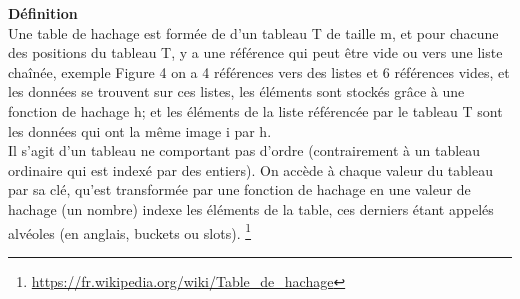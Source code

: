 \documentclass[hidelinks,a4paper,12pt]{article}
\begin{document}
	\bigbreak
		
	\textbf {Définition} 
	\medskip \\
	Une table de hachage est formée de d'un tableau T de taille m, et pour chacune des positions du tableau T, y a une référence qui peut être vide ou vers une liste chaînée, exemple Figure 4 on a 4 références vers des listes et 6 références vides, et les données se trouvent sur ces listes, les éléments sont stockés grâce à une fonction de hachage h; et les éléments de la liste référencée par le tableau T sont les données qui ont la même image i par h. \medskip \\
	Il s'agit d'un tableau ne comportant pas d'ordre (contrairement à un tableau ordinaire qui est indexé par des entiers). On accède à chaque valeur du tableau par sa clé, qu’est transformée par une fonction de hachage en une valeur de hachage (un nombre) indexe les éléments de la table, ces derniers étant appelés alvéoles (en anglais, buckets ou slots). \footnote[4]{\url{https://fr.wikipedia.org/wiki/Table_de_hachage}}
	
	\bigbreak\bigbreak
	
\end{document}
